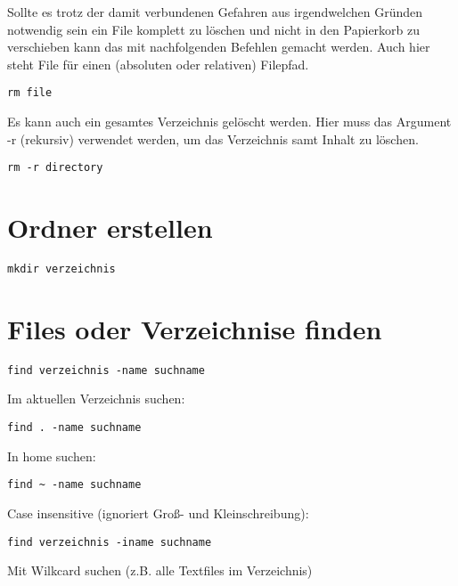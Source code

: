 \documentclass[]{book}
\begin{document}
Sollte es trotz der damit verbundenen Gefahren aus irgendwelchen Gründen notwendig sein ein File
komplett zu löschen und nicht in den Papierkorb zu verschieben kann das mit nachfolgenden Befehlen
gemacht werden. Auch hier steht File für einen (absoluten oder relativen) Filepfad.

\begin{verbatim}
rm file
\end{verbatim}

Es kann auch ein gesamtes Verzeichnis gelöscht werden. Hier muss das Argument -r (rekursiv) verwendet werden, um das Verzeichnis
samt Inhalt zu löschen.

\begin{verbatim}
rm -r directory
\end{verbatim}

\hypertarget{ordner-erstellen}{%
\section{Ordner erstellen}\label{ordner-erstellen}}

\begin{verbatim}
mkdir verzeichnis
\end{verbatim}

\hypertarget{files-oder-verzeichnise-finden}{%
\section{Files oder Verzeichnise finden}\label{files-oder-verzeichnise-finden}}

\begin{verbatim}
find verzeichnis -name suchname
\end{verbatim}

Im aktuellen Verzeichnis suchen:

\begin{verbatim}
find . -name suchname
\end{verbatim}

In home suchen:

\begin{verbatim}
find ~ -name suchname
\end{verbatim}

Case insensitive (ignoriert Groß- und Kleinschreibung):

\begin{verbatim}
find verzeichnis -iname suchname
\end{verbatim}

Mit Wilkcard suchen (z.B. alle Textfiles im Verzeichnis)
\end{document}
